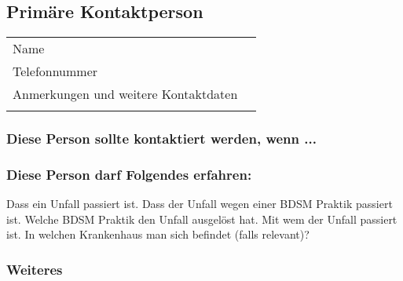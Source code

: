 \documentclass[a4paper,12pt]{article}
\begin{document}
\newpage
\subsection{Primäre Kontaktperson}
\begin{Form}
	\begin{tabular}{P|l}
		Name & \TextField[name=Contact1Name,width=25em]{}\\
		\hdashline
		Telefonnummer & \TextField[name=Contact1Telefon,width=25em]{} \\
		\hdashline
		Anmerkungen und weitere Kontaktdaten & \TextField[name=Contact1Kommentar,multiline=true,height=6em, width=25em]{} \\
		\hdashline
	\end{tabular}
\end{Form}

\subsubsection{Diese Person sollte kontaktiert werden, wenn ...}
\TextField[name=Contact1KontaktWenn,multiline=true,height=7em, width=37em]{}

\subsubsection{Diese Person darf Folgendes erfahren:}

\begin{Form}
	\noindent Dass ein Unfall passiert ist.
	\newline
	\noindent Dass der Unfall wegen einer BDSM Praktik passiert ist.
	\newline
	\noindent Welche BDSM Praktik den Unfall ausgelöst hat.
	\newline
	\noindent Mit wem der Unfall passiert ist.
	\newline
	\noindent In welchen Krankenhaus man sich befindet (falls relevant)?
\end{Form}

\subsubsection{Weiteres}
\end{document}
